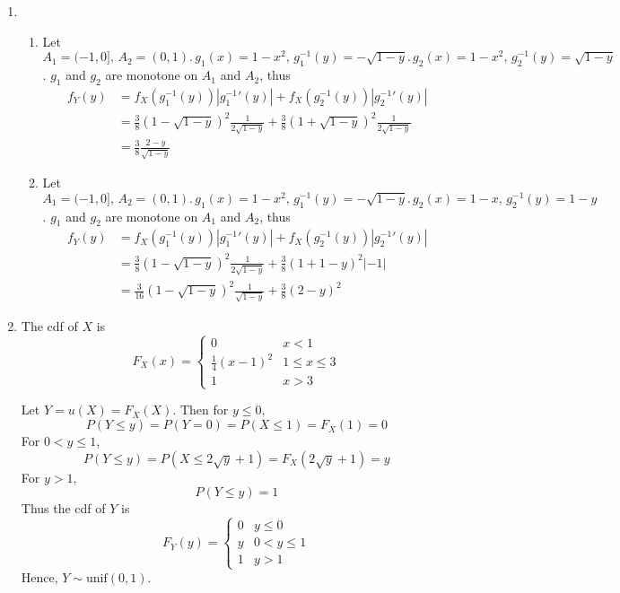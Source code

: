 \documentclass{article}
\begin{document}
\begin{enumerate}[leftmargin = 0 em, label = \arabic*., font = \bfseries]
\item \begin{enumerate}[start = 2]
	\item Let $A_1 = (-1,0],\, A_2 = (0,1). \, g_1 (x) = 1- x^2,\, g_1^{-1}(y) = -\sqrt{1 - y}.\, g_2 (x) = 1 - x^2,\, g_2^{-1} (y) = \sqrt{1 - y}$. $g_1$ and $g_2$ are monotone on $A_1$ and $A_2$, thus
	\begin{align*}
	f_Y(y) &= f_X(g_1^{-1}(y))|{g_1^{-1}}'(y)| +  f_X(g_2^{-1}(y))|{g_2^{-1}}'(y)|\\
	& = \frac{3}{8} (1 - \sqrt{1 - y})^2 \frac{1}{2 \sqrt{1 - y}} + \frac{3}{8} (1 + \sqrt{1 - y})^2 \frac{1}{2 \sqrt{1 - y}}\\
	& = \frac{3}{8} \frac{2 - y}{\sqrt{1 - y}}
	\end{align*}

	\item  Let $A_1 = (-1,0],\, A_2 = (0,1). \, g_1 (x) = 1- x^2,\, g_1^{-1}(y) = -\sqrt{1 - y}.\, g_2 (x) = 1 - x,\, g_2^{-1} (y) = 1 - y$. $g_1$ and $g_2$ are monotone on $A_1$ and $A_2$, thus
	\begin{align*}
	f_Y(y) &= f_X(g_1^{-1}(y))|{g_1^{-1}}'(y)| +  f_X(g_2^{-1}(y))|{g_2^{-1}}'(y)|\\
	& = \frac{3}{8} (1 - \sqrt{1 - y})^2 \frac{1}{2 \sqrt{1 - y}} + \frac{3}{8} (1 + 1 - y)^2 |-1|\\
	& = \frac{3}{16}(1 - \sqrt{1- y})^2 \frac{1}{\sqrt{1 - y}}+ \frac{3}{8} (2 - y)^2
	\end{align*}
	
\end{enumerate}

\item The cdf of $X$ is 
\[F_X (x) = \begin{cases}
0 & x <1\\
\frac{1}{4} (x -1)^2 & 1 \leq x \leq 3\\
1 & x>3
\end{cases}\]

Let $Y = u(X) = F_X (X) $. Then for $y\leq 0, $
\[P(Y\leq y) = P(Y = 0) = P(X \leq 1) = F_{X}(1) = 0 \]
For $0 <  y \leq 1 $,
\[P(Y \leq y) = P(X\leq 2 \sqrt{y}+1) = F_{X}(2 \sqrt{y} +1) = y\]
For $y > 1$,
\[P(Y\leq y) = 1\]
Thus the cdf of $Y$ is
\[F_Y(y) = \begin{cases}
0 & y\leq 0\\
y & 0<y\leq 1\\
1 & y > 1
\end{cases}\]
Hence, $Y \sim \mathrm{unif}(0,1)$.


\end{enumerate}
\end{document}
